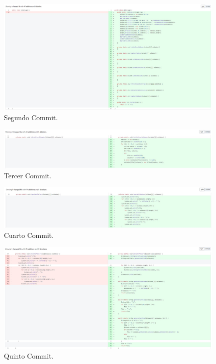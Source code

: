 \documentclass{article}
\begin{document}
\begin{figure}[H]
	\centering
	\includegraphics[width=1\textwidth,keepaspectratio]{img/commit02.jpg}
	\caption{Segundo Commit.}
\end{figure}
\begin{figure}[H]
	\centering
	\includegraphics[width=1\textwidth,keepaspectratio]{img/commit03.jpg}
	\caption{Tercer Commit.}
\end{figure}
\begin{figure}[H]
	\centering
	\includegraphics[width=1\textwidth,keepaspectratio]{img/commit04.jpg}
	\caption{Cuarto Commit.}
\end{figure}
\begin{figure}[H]
	\centering
	\includegraphics[width=1\textwidth,keepaspectratio]{img/commit05.jpg}
	\caption{Quinto Commit.}
\end{figure}
\end{document}
